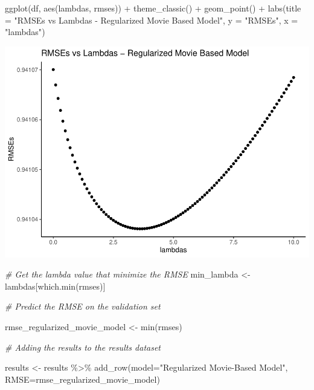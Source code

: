 \documentclass[
]{article}
\newenvironment{Shaded}{}{}
\newcommand{\AttributeTok}[1]{\textcolor[rgb]{0.49,0.56,0.16}{#1}}
\newcommand{\CommentTok}[1]{\textcolor[rgb]{0.38,0.63,0.69}{\textit{#1}}}
\newcommand{\FunctionTok}[1]{\textcolor[rgb]{0.02,0.16,0.49}{#1}}
\newcommand{\NormalTok}[1]{#1}
\newcommand{\OtherTok}[1]{\textcolor[rgb]{0.00,0.44,0.13}{#1}}
\newcommand{\SpecialCharTok}[1]{\textcolor[rgb]{0.25,0.44,0.63}{#1}}
\newcommand{\StringTok}[1]{\textcolor[rgb]{0.25,0.44,0.63}{#1}}
\begin{document}
\begin{Shaded}
\begin{Highlighting}[]
\FunctionTok{ggplot}\NormalTok{(df, }\FunctionTok{aes}\NormalTok{(lambdas, rmses)) }\SpecialCharTok{+}
   \FunctionTok{theme\_classic}\NormalTok{()  }\SpecialCharTok{+}
   \FunctionTok{geom\_point}\NormalTok{() }\SpecialCharTok{+}
   \FunctionTok{labs}\NormalTok{(}\AttributeTok{title =} \StringTok{"RMSEs vs Lambdas {-} Regularized Movie Based Model"}\NormalTok{,}
        \AttributeTok{y =} \StringTok{"RMSEs"}\NormalTok{,}
        \AttributeTok{x =} \StringTok{"lambdas"}\NormalTok{)}
\end{Highlighting}
\end{Shaded}

\begin{center}\includegraphics{MovieLens-Project-Code_files/figure-latex/unnamed-chunk-40-1} \end{center}

\begin{Shaded}
\begin{Highlighting}[]
\CommentTok{\# Get the lambda value that minimize the RMSE}
\NormalTok{min\_lambda }\OtherTok{\textless{}{-}}\NormalTok{ lambdas[}\FunctionTok{which.min}\NormalTok{(rmses)]}

\CommentTok{\# Predict the RMSE on the validation set}

\NormalTok{rmse\_regularized\_movie\_model }\OtherTok{\textless{}{-}} \FunctionTok{min}\NormalTok{(rmses)}

\CommentTok{\# Adding the results to the results dataset}

\NormalTok{results }\OtherTok{\textless{}{-}}\NormalTok{ results }\SpecialCharTok{\%\textgreater{}\%} \FunctionTok{add\_row}\NormalTok{(}\AttributeTok{model=}\StringTok{"Regularized Movie{-}Based Model"}\NormalTok{, }\AttributeTok{RMSE=}\NormalTok{rmse\_regularized\_movie\_model)}
\end{Highlighting}
\end{Shaded}
\end{document}
